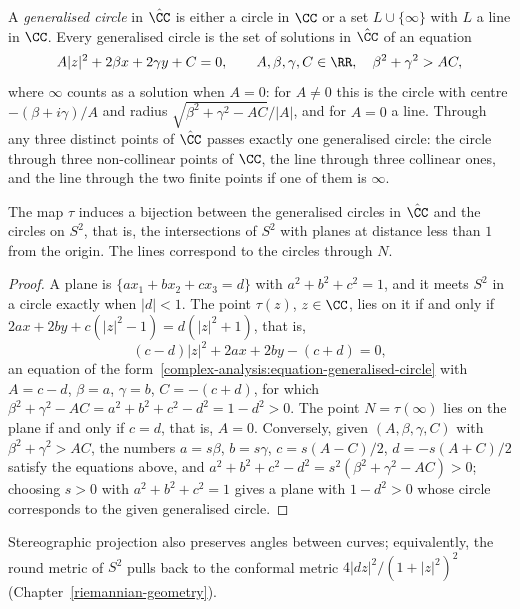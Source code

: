 A \emph{generalised circle} in $\hat{\CC}$ is either a circle in $\CC$ or a set $L \cup \{\infty\}$ with $L$ a line in $\CC$. Every generalised circle is the set of solutions in $\hat{\CC}$ of an equation
\begin{equation}\label{complex-analysis:equation-generalised-circle}
A|z|^2 + 2\beta x + 2\gamma y + C = 0, \qquad A, \beta, \gamma, C \in \RR, \quad \beta^2 + \gamma^2 > AC,
\end{equation}
where $\infty$ counts as a solution when $A = 0$: for $A \neq 0$ this is the circle with centre $-(\beta + i\gamma)/A$ and radius $\sqrt{\beta^2 + \gamma^2 - AC}/|A|$, and for $A = 0$ a line. Through any three
distinct points of $\hat{\CC}$ passes exactly one generalised circle: the circle through three non-collinear points of $\CC$, the line through three collinear ones, and the line through the two finite
points if one of them is $\infty$.

\begin{proposition}\label{complex-analysis:proposition-stereographic-circles}
The map $\tau$ induces a bijection between the generalised circles in $\hat{\CC}$ and the circles on $S^2$, that is, the intersections of $S^2$ with planes at distance less than $1$ from the origin. The lines
correspond to the circles through $N$.
\end{proposition}

\begin{proof}
A plane is $\{a x_1 + bx_2 + cx_3 = d\}$ with $a^2 + b^2 + c^2 = 1$, and it meets $S^2$ in a circle exactly when $|d| < 1$. The point $\tau(z)$, $z \in \CC$, lies on it if and only if
$2ax + 2by + c(|z|^2 - 1) = d(|z|^2 + 1)$, that is,
\[
(c - d)|z|^2 + 2ax + 2by - (c + d) = 0,
\]
an equation of the form~\eqref{complex-analysis:equation-generalised-circle} with $A = c - d$, $\beta = a$, $\gamma = b$, $C = -(c + d)$, for which $\beta^2 + \gamma^2 - AC = a^2 + b^2 + c^2 - d^2 = 1 - d^2 > 0$. The
point $N = \tau(\infty)$ lies on the plane if and only if $c = d$, that is, $A = 0$. Conversely, given $(A, \beta, \gamma, C)$ with $\beta^2 + \gamma^2 > AC$, the numbers $a = s\beta$, $b = s\gamma$, $c = s(A - C)/2$,
$d = -s(A + C)/2$ satisfy the equations above, and $a^2 + b^2 + c^2 - d^2 = s^2(\beta^2 + \gamma^2 - AC) > 0$; choosing $s > 0$ with $a^2 + b^2 + c^2 = 1$ gives a plane with $1 - d^2 > 0$ whose circle corresponds to the
given generalised circle.
\end{proof}

Stereographic projection also preserves angles between curves; equivalently, the round metric of $S^2$ pulls back to the conformal metric $4|dz|^2/(1 + |z|^2)^2$ (Chapter~\ref{riemannian-geometry}).

